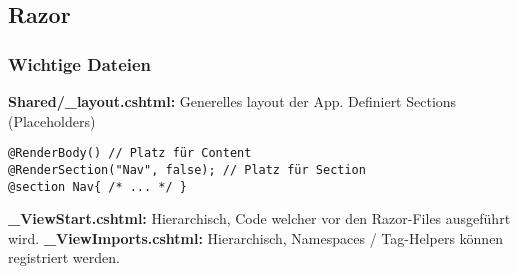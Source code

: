 \subsection{Razor}

\subsubsection{Wichtige Dateien}
\textbf{Shared/\_layout.cshtml:} Generelles layout der App. Definiert Sections (Placeholders)
\begin{lstlisting}[style=CSharp]
@RenderBody() // Platz für Content
@RenderSection("Nav", false); // Platz für Section
@section Nav{ /* ... */ }
\end{lstlisting}
\textbf{\_ViewStart.cshtml:} Hierarchisch, Code welcher vor den Razor-Files ausgeführt wird.
\textbf{\_ViewImports.cshtml:} Hierarchisch, Namespaces / Tag-Helpers können registriert werden.



